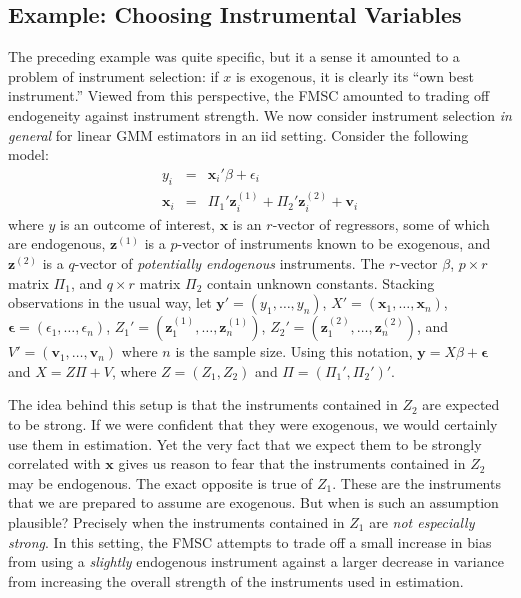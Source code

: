 \subsection{Example: Choosing Instrumental Variables}
\label{sec:chooseIVlowlevel}
The preceding example was quite specific, but it a sense it amounted to a problem of instrument selection: if $x$ is exogenous, it is clearly its ``own best instrument.'' 
Viewed from this perspective, the FMSC amounted to trading off endogeneity against instrument strength. We now consider instrument selection \emph{in general} for linear GMM estimators in an iid setting. 
Consider the following model:
\begin{eqnarray}
    y_i &=& \mathbf{x}_i' \beta +  \epsilon_i\\
    \mathbf{x}_i &=&  \Pi_1' \mathbf{z}_{i}^{(1)} + \Pi_2'\mathbf{z}_{i}^{(2)} + \mathbf{v}_i
\end{eqnarray}
where $y$ is an outcome of interest, $\mathbf{x}$ is an $r$-vector of regressors, some of which are endogenous, $\mathbf{z}^{(1)}$ is a $p$-vector of instruments known to be exogenous, and $\mathbf{z}^{(2)}$ is a $q$-vector  of \emph{potentially endogenous} instruments. 
The $r$-vector $\beta$, $p\times r$ matrix $\Pi_1$, and $q\times r$ matrix $\Pi_2$ contain unknown constants. Stacking observations in the usual way, let $\mathbf{y}' = (y_1, \hdots, y_n)$, $X' = (\mathbf{x}_1, \hdots, \mathbf{x}_n)$, $\boldsymbol{\epsilon} = (\epsilon_1, \hdots, \epsilon_n)$, 
$Z_1' = (\mathbf{z}_{1}^{(1)}, \hdots, \mathbf{z}_{n}^{(1)})$, $Z_2' = (\mathbf{z}_{1}^{(2)}, \hdots, \mathbf{z}_{n}^{(2)})$, and $V' = (\mathbf{v}_1, \hdots, \mathbf{v}_n)$ where $n$ is the sample size.
Using this notation, $\mathbf{y} = X\beta +\boldsymbol{\epsilon}$ and $X =  Z \Pi + V$, where $Z = (Z_1, Z_2)$ and $\Pi = (\Pi_1', \Pi_2')'$. 

The idea behind this setup is that the instruments contained in $Z_2$ are expected to be strong. 
If we were confident that they were exogenous, we would certainly use them in estimation. 
Yet the very fact that we expect them to be strongly correlated with $\mathbf{x}$ gives us reason to fear that the instruments contained in $Z_2$ may be endogenous. 
The exact opposite is true of $Z_1$. These are the instruments that we are prepared to assume are exogenous. 
But when is such an assumption plausible? Precisely when the instruments contained in $Z_1$ are \emph{not especially strong}. 
In this setting, the FMSC attempts to trade off a small increase in bias from using a \emph{slightly} endogenous instrument against a larger decrease in variance from increasing the overall strength of the instruments used in estimation.

